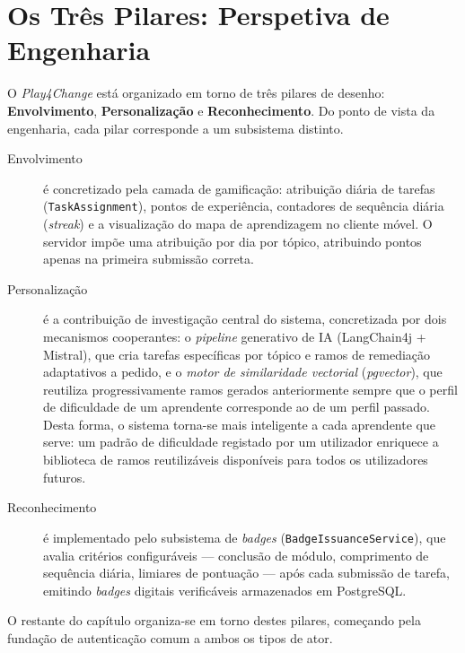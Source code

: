 \section{Os Três Pilares: Perspetiva de Engenharia}
\label{sec:tres_pilares}

O \textit{Play4Change} está organizado em torno de três pilares de desenho:
\textbf{Envolvimento}, \textbf{Personalização} e \textbf{Reconhecimento}.
Do ponto de vista da engenharia, cada pilar corresponde a um subsistema
distinto.

\begin{description}
  \item[Envolvimento] é concretizado pela camada de gamificação:
    atribuição diária de tarefas (\texttt{TaskAssignment}), pontos de
    experiência, contadores de sequência diária (\textit{streak}) e a
    visualização do mapa de aprendizagem no cliente móvel.
    O servidor impõe uma atribuição por dia por tópico, atribuindo pontos
    apenas na primeira submissão correta.

  \item[Personalização] é a contribuição de investigação central do
    sistema, concretizada por dois mecanismos cooperantes: o
    \textit{pipeline} generativo de IA (LangChain4j + Mistral), que cria
    tarefas específicas por tópico e ramos de remediação adaptativos a
    pedido, e o \textit{motor de similaridade vectorial} (\textit{pgvector}),
    que reutiliza progressivamente ramos gerados anteriormente sempre que
    o perfil de dificuldade de um aprendente corresponde ao de um perfil
    passado.
    Desta forma, o sistema torna-se mais inteligente a cada aprendente que
    serve: um padrão de dificuldade registado por um utilizador enriquece
    a biblioteca de ramos reutilizáveis disponíveis para todos os
    utilizadores futuros.

  \item[Reconhecimento] é implementado pelo subsistema de
    \textit{badges} (\texttt{BadgeIssuanceService}), que avalia critérios
    configuráveis — conclusão de módulo, comprimento de sequência diária,
    limiares de pontuação — após cada submissão de tarefa, emitindo
    \textit{badges} digitais verificáveis armazenados em PostgreSQL.
\end{description}

O restante do capítulo organiza-se em torno destes pilares, começando
pela fundação de autenticação comum a ambos os tipos de ator.

